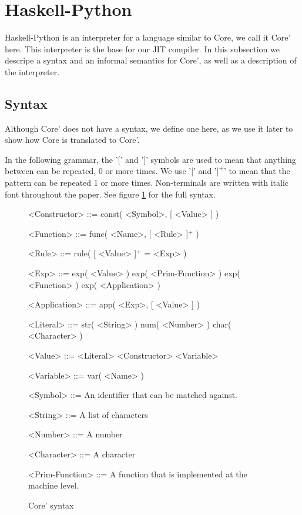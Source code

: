 
\section{Haskell-Python}
\label{chap:hs}


Haskell-Python\cite{haskellpython}
is an interpreter for a language similar to Core, we call it Core' here.
This interpreter is the base for our JIT compiler. In this subsection we descripe a 
syntax and an informal semantics for Core', as well as a description of the 
interpreter.


\subsection{Syntax}
\label{sec:syntax}

Although Core' does not have a syntax, we define one here, as we use it later 
to show how Core is translated to Core'.

In the following grammar, the '[' and ']' symbols are used to mean that
anything between can be repeated, 0 or more times. We use '[' and '$]^+$' to 
mean that the pattern can be repeated 1 or more times. Non-terminals are 
written with italic font throughout the paper.
See figure \ref{gr:coresyn} for the full syntax.

\begin{figure}[H]
\centering

\begin{grammar}
<Constructor> ::= const( <Symbol>, [ <Value> ] )

<Function> ::= func( <Name>, [ <Rule> ]$^+$ )

<Rule> ::= rule( [ <Value> ]$^+$ = <Exp> )

<Exp> ::= exp( <Value> )
     \alt exp( <Prim-Function> )
     \alt exp( <Function> )
     \alt exp( <Application> )

<Application> ::= app( <Exp>, [ <Value> ] )

<Literal> ::= str( <String> )
	 \alt num( <Number> )
	 \alt char( <Character> )

<Value> ::= <Literal>
       \alt <Constructor>
       \alt <Variable>

<Variable> ::= var( <Name> )

<Symbol> ::= An identifier that can be matched against.

<String> ::= A list of characters

<Number> ::= A number

<Character> ::= A character

<Prim-Function> ::= A function that is implemented at the machine level.

\end{grammar}

\caption{Core' syntax}
\label{gr:coresyn}

\end{figure}


